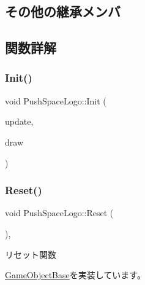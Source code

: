 \subsection*{その他の継承メンバ}


\subsection{関数詳解}
\mbox{\label{class_push_space_logo_a381d34d0dfdd493eb46f299d2a2ba858}} 
\subsubsection{\texorpdfstring{Init()}{Init()}}
{\footnotesize\ttfamily void Push\+Space\+Logo\+::\+Init (\begin{DoxyParamCaption}\item[{\mbox{\hyperlink{class_update_base}{Update\+Base}} $\ast$}]{update,  }\item[{\mbox{\hyperlink{class_draw_base}{Draw\+Base}} $\ast$}]{draw }\end{DoxyParamCaption})}

\mbox{\label{class_push_space_logo_afa163b1aff8df494b4f09f378bf983f0}} 
\subsubsection{\texorpdfstring{Reset()}{Reset()}}
{\footnotesize\ttfamily void Push\+Space\+Logo\+::\+Reset (\begin{DoxyParamCaption}{ }\end{DoxyParamCaption})\hspace{0.3cm}{\ttfamily [override]}, {\ttfamily [virtual]}}



リセット関数 



\mbox{\hyperlink{class_game_object_base_a85c59554f734bcb09f1a1e18d9517dce}{Game\+Object\+Base}}を実装しています。

\mbox{\label{class_push_space_logo_a06404113db417c58941ca7a13bba161e}} 
